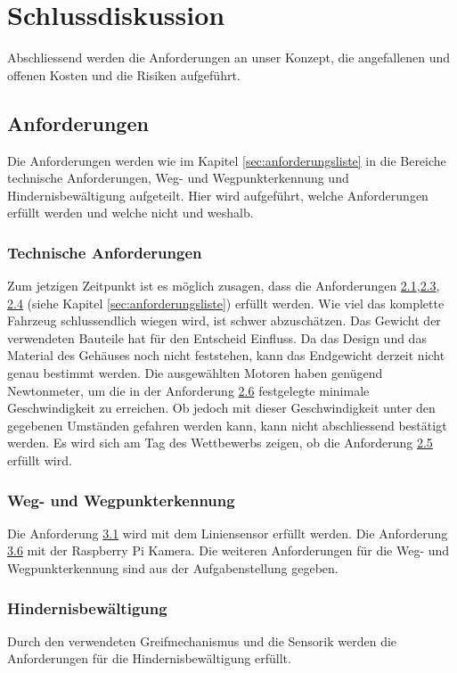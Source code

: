 \documentclass[../main.tex]{subfiles}
\begin{document}
\newpage
\section{Schlussdiskussion}

Abschliessend werden die Anforderungen an unser Konzept, die angefallenen und offenen Kosten und die Risiken aufgeführt. 
\subsection{Anforderungen}
Die Anforderungen werden wie im Kapitel \ref{sec:anforderungsliste} in die Bereiche technische Anforderungen, Weg- und Wegpunkterkennung und Hindernisbewältigung aufgeteilt. Hier wird aufgeführt, welche Anforderungen erfüllt werden und welche nicht und weshalb.

\subsubsection{Technische Anforderungen}
Zum jetzigen Zeitpunkt ist es möglich zusagen, dass die Anforderungen \hyperlink{A2.1}{2.1},\hyperlink{A2.3}{2.3}, \hyperlink{A2.4}{2.4} (siehe Kapitel \ref{sec:anforderungsliste}) erfüllt werden. Wie viel das komplette Fahrzeug schlussendlich wiegen wird, ist schwer abzuschätzen. Das Gewicht der verwendeten Bauteile hat für den Entscheid Einfluss. Da das Design und das Material des Gehäuses noch nicht feststehen, kann das Endgewicht derzeit nicht genau bestimmt werden. Die ausgewählten Motoren haben genügend Newtonmeter, um die in der Anforderung \hyperlink{A2.6}{2.6} festgelegte minimale Geschwindigkeit zu erreichen. Ob jedoch mit dieser Geschwindigkeit unter den gegebenen Umständen gefahren werden kann, kann nicht abschliessend bestätigt werden.
Es wird sich am Tag des Wettbewerbs zeigen, ob die Anforderung \hyperlink{A2.5}{2.5} erfüllt wird.

\subsubsection{Weg- und Wegpunkterkennung}
Die Anforderung \hyperlink{A3.1}{3.1} wird mit dem Liniensensor erfüllt werden. Die Anforderung \hyperlink{A3.6}{3.6} mit der Raspberry Pi Kamera. Die weiteren Anforderungen für die Weg- und Wegpunkterkennung sind aus der Aufgabenstellung gegeben.

\subsubsection{Hindernisbewältigung}
Durch den verwendeten Greifmechanismus und die Sensorik werden die Anforderungen für die Hindernisbewältigung erfüllt.
\end{document}
